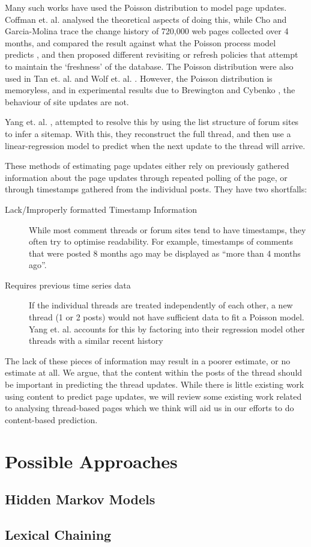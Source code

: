 \documentclass{article}
\begin{document}
Many such works have used the Poisson distribution to model page updates. Coffman et. al. \cite{Coffman1997} analysed the theoretical aspects of doing this, while Cho and Garcia-Molina trace the change history of 720,000 web pages collected over 4 months, and compared the result against what the Poisson process model predicts \cite{Cho1999}, and then proposed different revisiting or refresh policies \cite{Cho2003,Garcia-molina2003} that attempt to maintain the `freshness' of the database. The Poisson distribution were also used in Tan et. al. \cite{Tan2007} and Wolf et. al. \cite{Wolf2002}. %
However, the Poisson distribution is memoryless, and in experimental results due to Brewington and Cybenko \cite{Brian2000}, the behaviour of site updates are not.

Yang et. al. \cite{Yang2009}, attempted to resolve this by using the list structure of forum sites to infer a sitemap. With this, they reconstruct the full thread, and then use a linear-regression model to predict when the next update to the thread will arrive. %

These methods of estimating page updates either rely on previously gathered information about the page updates through repeated polling of the page, or through timestamps gathered from the individual posts. They have two shortfalls:

\begin{description}
	\item[Lack/Improperly formatted Timestamp Information] While most comment threads or forum sites tend to have timestamps, they often try to optimise readability. For example, timestamps of comments that were posted 8 months ago may be displayed as ``more than 4 months ago''. 
	\item[Requires previous time series data]
		If the individual threads are treated independently of each other, a new thread (1 or 2 posts) would not have sufficient data to fit a Poisson model. Yang et. al. \cite{Yang2009} accounts for this by factoring into their regression model other threads with a similar recent history
\end{description}
The lack of these pieces of information may result in a poorer estimate, or no estimate at all. We argue, that the content within the posts of the thread should be important in predicting the thread updates. While there is little existing work using content to predict page updates, we will review some existing work related to analysing thread-based pages which we think will aid us in our efforts to do content-based prediction.



\section{Possible Approaches}

\subsection{Hidden Markov Models}
\subsection{Lexical Chaining}



\end{document}
